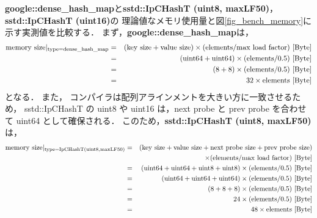 {\bf google::dense\_hash\_map}と{\bf sstd::IpCHashT (uint8, maxLF50)}，{\bf sstd::IpCHashT (uint16)}の
理論値なメモリ使用量と図\ref{fig_bench_memory}に示す実測値を比較する．
まず，{\bf google::dense\_hash\_map}は，
\begin{eqnarray*}
  {\rm memory\ size|_{type=dense\_hash\_map}} &=& ({\rm key\ size} + {\rm value\ size}) \times ({\rm elements} / {\rm max\ load\ factor}) {\rm\ [Byte]}\\
  &=& ({\rm uint64} + {\rm uint64}) \times ({\rm elements} / 0.5) {\rm\ [Byte]}\\
  &=& (8 + 8) \times ({\rm elements} / 0.5) {\rm\ [Byte]}\\
  &=& 32 \times {\rm elements} {\rm\ [Byte]}
\end{eqnarray*}
となる．
また，
コンパイラは配列アラインメントを大きい方に一致させるため，
sstd::IpCHashT の uint8 や uint16 は，next probe と prev probe を合わせて uint64 として確保される．
このため，{\bf sstd::IpCHashT (uint8, maxLF50)}は，
\begin{eqnarray*}
  {\rm memory\ size|_{type=IpCHashT (uint8, maxLF50)}} &=& ({\rm key\ size} + {\rm value\ size} + {\rm next\ probe\ size} + {\rm prev\ probe\ size})\\
                                              & & \times ({\rm elements} / {\rm max\ load\ factor}) {\rm\ [Byte]}\\
  &=& ({\rm uint64} + {\rm uint64} + {\rm uint8} + {\rm uint8}) \times ({\rm elements} / 0.5) {\rm\ [Byte]}\\
  &=& ({\rm uint64} + {\rm uint64} + {\rm uint64}) \times ({\rm elements} / 0.5) {\rm\ [Byte]}\\
  &=& (8 + 8 + 8) \times ({\rm elements} / 0.5) {\rm\ [Byte]}\\
  &=& 24 \times ({\rm elements} / 0.5) {\rm\ [Byte]}\\
  &=& 48 \times {\rm elements} {\rm\ [Byte]}
\end{eqnarray*}
